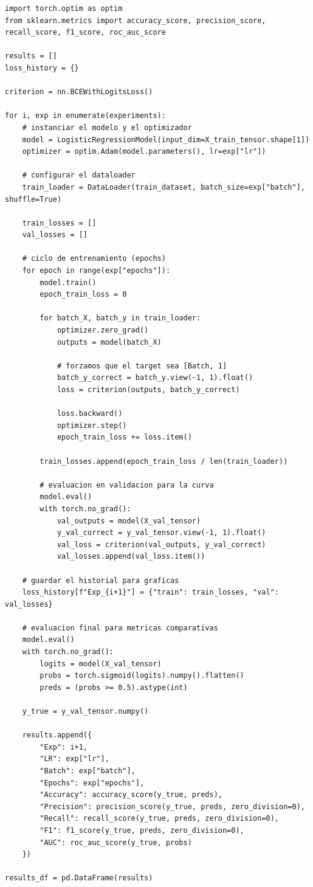 \documentclass[conference]{IEEEtran}
\begin{document}
\begin{lstlisting}[caption={Ejecución de los diez entrenamientos y almacenamiento de Loss}, label={lst:10runs}]
import torch.optim as optim
from sklearn.metrics import accuracy_score, precision_score, recall_score, f1_score, roc_auc_score

results = []
loss_history = {} 

criterion = nn.BCEWithLogitsLoss()

for i, exp in enumerate(experiments): 
    # instanciar el modelo y el optimizador
    model = LogisticRegressionModel(input_dim=X_train_tensor.shape[1])
    optimizer = optim.Adam(model.parameters(), lr=exp["lr"])
    
    # configurar el dataloader
    train_loader = DataLoader(train_dataset, batch_size=exp["batch"], shuffle=True)
    
    train_losses = []
    val_losses = []
    
    # ciclo de entrenamiento (epochs)
    for epoch in range(exp["epochs"]):
        model.train()
        epoch_train_loss = 0
        
        for batch_X, batch_y in train_loader:
            optimizer.zero_grad()
            outputs = model(batch_X)
            
            # forzamos que el target sea [Batch, 1]
            batch_y_correct = batch_y.view(-1, 1).float()
            loss = criterion(outputs, batch_y_correct)
            
            loss.backward()
            optimizer.step()
            epoch_train_loss += loss.item()
            
        train_losses.append(epoch_train_loss / len(train_loader))
        
        # evaluacion en validacion para la curva
        model.eval()
        with torch.no_grad():
            val_outputs = model(X_val_tensor)
            y_val_correct = y_val_tensor.view(-1, 1).float()
            val_loss = criterion(val_outputs, y_val_correct)
            val_losses.append(val_loss.item())
            
    # guardar el historial para graficas
    loss_history[f"Exp_{i+1}"] = {"train": train_losses, "val": val_losses}
    
    # evaluacion final para metricas comparativas
    model.eval()
    with torch.no_grad():
        logits = model(X_val_tensor)
        probs = torch.sigmoid(logits).numpy().flatten()
        preds = (probs >= 0.5).astype(int)
        
    y_true = y_val_tensor.numpy()
    
    results.append({
        "Exp": i+1,
        "LR": exp["lr"],
        "Batch": exp["batch"],
        "Epochs": exp["epochs"],
        "Accuracy": accuracy_score(y_true, preds),
        "Precision": precision_score(y_true, preds, zero_division=0),
        "Recall": recall_score(y_true, preds, zero_division=0),
        "F1": f1_score(y_true, preds, zero_division=0),
        "AUC": roc_auc_score(y_true, probs)
    })

results_df = pd.DataFrame(results)
\end{lstlisting}
\end{document}
